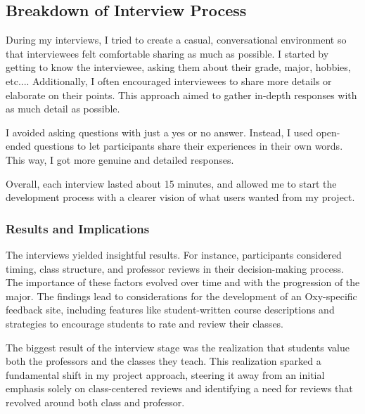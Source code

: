 \documentclass[10pt,twocolumn]{article}
\begin{document}
\subsection{Breakdown of Interview Process}

During my interviews, I tried to create a casual, conversational environment so that interviewees felt comfortable sharing as much as possible. I started by getting to know the interviewee, asking them about their grade, major, hobbies, etc.... Additionally, I often encouraged interviewees to share more details or elaborate on their points. This approach aimed to gather in-depth responses with as much detail as possible.

I avoided asking questions with just a yes or no answer. Instead, I used open-ended questions to let participants share their experiences in their own words. This way, I got more genuine and detailed responses.

Overall, each interview lasted about 15 minutes, and allowed me to start the development process with a clearer vision of what users wanted from my project.


\subsubsection{Results and Implications}

The interviews yielded insightful results. For instance, participants considered timing, class structure, and professor reviews in their decision-making process. The importance of these factors evolved over time and with the progression of the major. The findings lead to considerations for the development of an Oxy-specific feedback site, including features like student-written course descriptions and strategies to encourage students to rate and review their classes.


The biggest result of the interview stage was the realization that students value both the professors and the classes they teach. This realization sparked a fundamental shift in my project approach, steering it away from an initial emphasis solely on class-centered reviews and identifying a need for reviews that revolved around both class and professor. 
\end{document}

